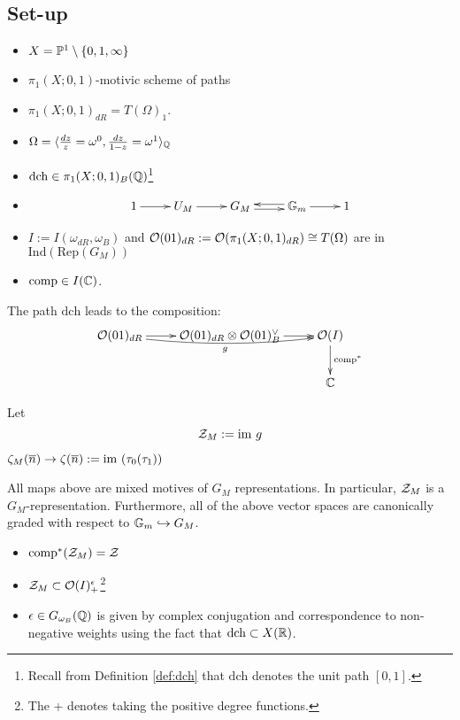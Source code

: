 \subsection{Set-up}
\begin{itemize}
\item $X = \mathbb{P}^1 \setminus \{0,1,\infty\}$
\item $\pi_1(X;0,1)$-motivic scheme of paths 
\item $\pi_1(X;0,1)_{dR} = T(\Omega)_1$.
\item $\Omega = \langle \frac{dz}{z} = \omega^0, \frac{dz}{1-z} = \omega^1 \rangle_{\mathbb{Q}}$
\item $\mathrm{dch} \in \pi_1(X;0,1)_B(\mathbb{Q})$\footnote{Recall from Definition \ref{def:dch} that $\mathrm{dch}$ denotes the unit path $[0,1]$.}
\item \[
\xymatrix{
1 \ar[r] & U_M \ar[r] & G_M \ar@<-0.2em>[r] & \Gm \ar@<-0.2em>[l] \ar[r] & 1
}
\]
\item $I := I(\omega_{dR}, \omega_B)$ and $\mathcal{O}(01)_{dR} := \mathcal{O}(\pi_1(X;0,1)_{dR}) \cong T(\Omega)$ are in $\mathrm{Ind}(\mathrm{Rep}(G_M))$
\item $\mathrm{comp} \in I(\mathbb{C})$.
\end{itemize}

\begin{defn}
The path $\mathrm{dch}$ leads to the composition:
\[
\xymatrix{
\cO(01)_{dR} \ar[r] \ar@/_/@{->}[rr]_g & \cO(01)_{dR} \otimes \cO(01)^{\vee}_B \ar[r] & \cO(I) \ar[d]^{\mathrm{comp}^*} \\
& & \C
}
\]
\end{defn}
\begin{defn}
Let
\[
\mathcal{Z}_M := \mathrm{im}~ g
\]
\end{defn}
$\zeta_M(\overline{n}) \to \zeta(\overline{n}) := \mathrm{im}~(\tau_0(\tau_1))$

\begin{rem}
All maps above are mixed motives of $G_M$ representations. In particular, $\mathcal{Z}_M$ is a $G_M$-representation. Furthermore, all of the above vector spaces are canonically graded with respect to $\mathbb{G}_m \hookrightarrow G_M$.
\begin{itemize}
\item $\mathrm{comp}^*(\mathcal{Z}_M) = \mathcal{Z}$
\item $\mathcal{Z}_M \subset \mathcal{O}(I)^{\epsilon}_+$\footnote{The + denotes taking the positive degree functions.}
\item $\epsilon \in G_{\omega_B}(\mathbb{Q})$ is given by complex conjugation and correspondence to non-negative weights using the fact that $\mathrm{dch} \subset X(\mathbb{R})$.
\end{itemize}
\end{rem}

